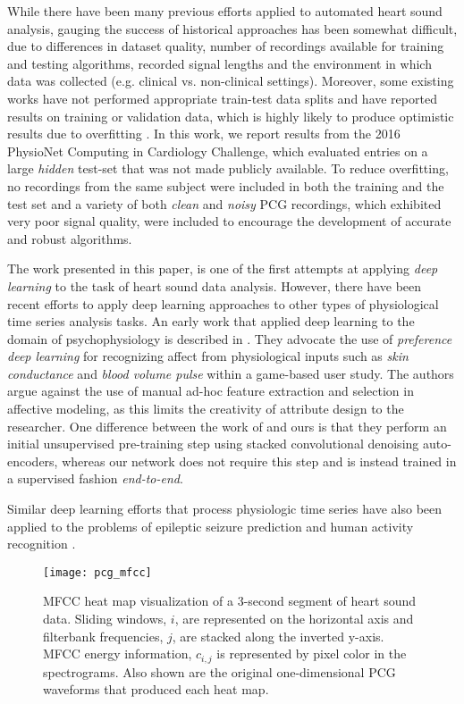 \documentclass{article}
\begin{document}
While there have been many previous efforts applied to automated heart sound analysis, gauging the success of historical approaches has been somewhat difficult, due to differences in dataset quality, number of recordings available for training and testing algorithms, recorded signal lengths and the environment in which data was collected (e.g. clinical vs. non-clinical settings). Moreover, some existing works have not performed appropriate train-test data splits and have reported results on training or validation data, which is highly likely to produce optimistic results due to overfitting \cite{liu2016open}. In this work, we report results from the 2016 PhysioNet Computing in Cardiology Challenge, which evaluated entries on a large \emph{hidden} test-set that was not made publicly available. To reduce overfitting, no recordings from the same subject were included in both the training and the test set and a variety of both \emph{clean} and \emph{noisy} PCG recordings, which exhibited very poor signal quality, were included to encourage the development of accurate and robust algorithms.

The work presented in this paper, is one of the first attempts at applying \emph{deep learning} to the task of heart sound data analysis. However, there have been recent efforts to apply deep learning approaches to other types of physiological time series analysis tasks. An early work that applied deep learning to the domain of psychophysiology is described in \cite{DBLP:journals/cim/MartinezBY13}. They advocate the use of \emph{preference deep learning} for recognizing affect from physiological inputs such as \emph{skin conductance} and \emph{blood volume pulse} within a game-based user study. The authors argue against the use of manual ad-hoc feature extraction and selection in affective modeling, as this limits the creativity of attribute design to the researcher. One difference between the work of \cite{DBLP:journals/cim/MartinezBY13} and ours is that they perform an initial unsupervised pre-training step using stacked convolutional denoising auto-encoders, whereas our network does not require this step and is instead trained in a supervised fashion \emph{end-to-end}.

Similar deep learning efforts that process physiologic time series have also been applied to the problems of epileptic seizure prediction \cite{mirowski2008comparing} and human activity recognition \cite{DBLP:conf/ijcai/HammerlaHP16}.

\begin{figure*}
\texttt{[image: pcg\_mfcc]}
\caption{MFCC heat map visualization of a 3-second segment of heart sound data. Sliding windows, $i$, are represented on the horizontal axis and filterbank frequencies, $j$, are stacked along the inverted y-axis. MFCC energy information, $c_{i,j}$ is represented by pixel color in the spectrograms. Also shown are the original one-dimensional PCG waveforms that produced each heat map.}
\label{fig:heatmap}
\end{figure*}
\end{document}
